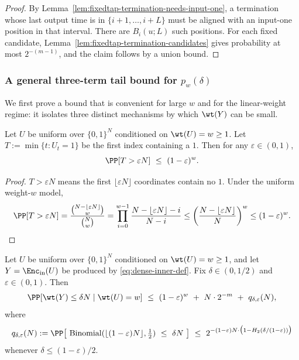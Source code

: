 \begin{proof}
By Lemma~\ref{lem:fixedtap-termination-needs-input-one}, a termination whose last output time is in
\(\{i+1,\dots,i+L\}\) must be aligned with an input-one position in that interval. There are \(B_i(u;L)\) such
positions. For each fixed candidate, Lemma~\ref{lem:fixedtap-termination-candidates} gives probability at most
\(2^{-(m-1)}\), and the claim follows by a union bound.
\end{proof}

\subsubsection{A general three-term tail bound for $p_w(\delta)$}
\label{subsec:inner-dense-three-term}

We first prove a bound that is convenient for large $w$ and for the linear-weight regime:
it isolates three distinct mechanisms by which $\wt(Y)$ can be small.

\begin{lemma}
\label{lem:first-one-early}
Let $U$ be uniform over $\{0,1\}^N$ conditioned on $\wt(U)=w\ge 1$.
Let $T:=\min\{t:U_t=1\}$ be the first index containing a $1$.
Then for any $\varepsilon\in(0,1)$,
\[
\PP[T>\varepsilon N]\ \le\ (1-\varepsilon)^w.
\]
\end{lemma}

\begin{proof}
$T>\varepsilon N$ means the first $\lfloor \varepsilon N\rfloor$ coordinates contain no $1$.
Under the uniform weight-$w$ model,
\[
\PP[T>\varepsilon N]
=
\frac{\binom{N-\lfloor\varepsilon N\rfloor}{w}}{\binom{N}{w}}
=
\prod_{i=0}^{w-1}\frac{N-\lfloor\varepsilon N\rfloor-i}{N-i}
\le
\left(\frac{N-\lfloor\varepsilon N\rfloor}{N}\right)^w
\le
(1-\varepsilon)^w.
\]
\end{proof}

\begin{lemma}
\label{lem:dense-three-term-tail}
Let $U$ be uniform over $\{0,1\}^N$ conditioned on $\wt(U)=w\ge 1$, and let $Y=\Enc_{\mathrm{in}}(U)$ be produced by
\eqref{eq:dense-inner-def}. Fix $\delta\in(0,1/2)$ and $\varepsilon\in(0,1)$. Then
\begin{equation}
\label{eq:dense-three-term}
\PP[\wt(Y)\le \delta N \mid \wt(U)=w]
\ \le\
(1-\varepsilon)^w\ +\ N\cdot 2^{-m}\ +\ q_{\delta,\varepsilon}(N),
\end{equation}
where
\[
q_{\delta,\varepsilon}(N)
:=
\PP\!\left[\ \mathrm{Binomial}(\lfloor(1-\varepsilon)N\rfloor,\tfrac12)\ \le\ \delta N\ \right]
\ \le\
2^{-(1-\varepsilon)N\cdot \big(1-H_2(\delta/(1-\varepsilon))\big)}
\]
whenever $\delta\le (1-\varepsilon)/2$.
\end{lemma}

